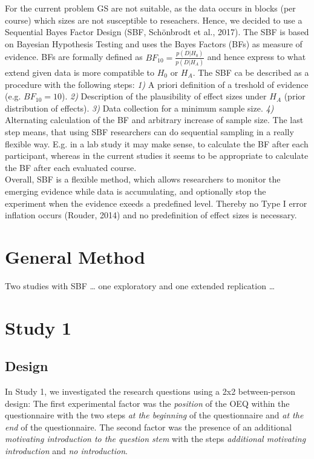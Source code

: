 \documentclass[man]{apa6}
\begin{document}
For the current problem GS are not suitable, as the data occurs in blocks (per course) which sizes are not susceptible to reseachers. Hence, we decided to use a Sequential Bayes Factor Design (SBF, Schönbrodt et al., 2017). The SBF is based on Bayesian Hypothesis Testing and uses the Bayes Factors (BFs) as measure of evidence. BFs are formally defined as \(BF_{10}=\frac{p(D|H_0)}{p(D|H_A)}\) and hence express to what extend given data is more compatible to \(H_0\) or \(H_A\).
The SBF ca be described as a procedure with the following steps: \emph{1)} A priori definition of a treshold of evidence (e.g. \(BF_{10} = 10\)). \emph{2)} Description of the plausibility of effect sizes under \(H_A\) (prior distribution of effects). \emph{3)} Data collection for a minimum sample size. \emph{4)} Alternating calculation of the BF and arbitrary increase of sample size. The last step means, that using SBF researchers can do sequential sampling in a really flexible way. E.g. in a lab study it may make sense, to calculate the BF after each participant, whereas in the current studies it seems to be appropriate to calculate the BF after each evaluated course.\\
Overall, SBF is a flexible method, which allows researchers to monitor the emerging evidence while data is accumulating, and optionally stop the experiment when the evidence exeeds a predefined level. Thereby no Type I error inflation occurs (Rouder, 2014) and no predefinition of effect sizes is necessary.

\hypertarget{general-method}{%
\section{General Method}\label{general-method}}

Two studies with SBF \ldots{} one exploratory and one extended replication \ldots{}

\hypertarget{study-1}{%
\section{Study 1}\label{study-1}}

\hypertarget{design}{%
\subsection{Design}\label{design}}

In Study 1, we investigated the research questions using a 2x2 between-person design: The first experimental factor was the \emph{position} of the OEQ within the questionnaire with the two steps \emph{at the beginning} of the questionnaire and \emph{at the end} of the questionnaire. The second factor was the presence of an additional \emph{motivating introduction to the question stem} with the steps \emph{additional motivating introduction} and \emph{no introduction}.
\end{document}
